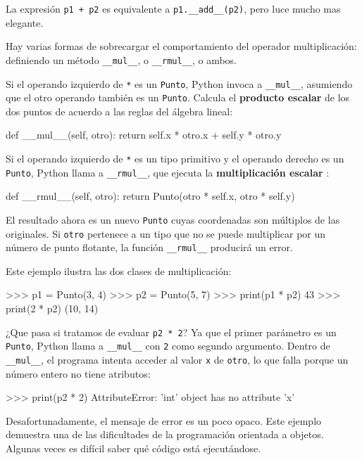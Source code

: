 La expresión \texttt{p1 + p2} es equivalente a \texttt{p1.\_\_add\_\_(p2)},
pero luce mucho mas elegante.

Hay varias formas de sobrecargar el comportamiento del operador multiplicación:
definiendo un método \texttt{\_\_mul\_\_}, o \texttt{\_\_rmul\_\_},
o ambos.

Si el operando izquierdo de \texttt{{*}} es un \texttt{Punto}, Python
invoca a \texttt{\_\_mul\_\_}, asumiendo que el otro operando también
es un \texttt{Punto}. Calcula el \textbf{producto escalar} de los
dos puntos de acuerdo a las reglas del álgebra lineal:
\begin{pythoncode}
def __mul__(self, otro):
  return self.x * otro.x + self.y * otro.y
\end{pythoncode}

Si el operando izquierdo de \texttt{{*}} es un tipo primitivo y el
operando derecho es un \texttt{Punto}, Python llama a \texttt{\_\_rmul\_\_},
que ejecuta la \textbf{multiplicación escalar }:
\begin{pythoncode}
def __rmul__(self, otro):
  return Punto(otro * self.x,  otro * self.y)
\end{pythoncode}

El resultado ahora es un nuevo \texttt{Punto} cuyas coordenadas son
múltiplos de las originales. Si \texttt{otro} pertenece a un tipo
que no se puede multiplicar por un número de punto flotante, la función
\texttt{\_\_rmul\_\_} producirá un error.

Este ejemplo ilustra las dos clases de multiplicación:
\begin{pyconcode}
>>> p1 = Punto(3, 4)
>>> p2 = Punto(5, 7)
>>> print(p1 * p2)
43
>>> print(2 * p2)
(10, 14)
\end{pyconcode}
 ¿Que pasa si tratamos de evaluar \texttt{p2 {*} 2}? Ya que el primer
parámetro es un \texttt{Punto}, Python llama a \texttt{\_\_mul\_\_}
con \texttt{2} como segundo argumento. Dentro de \texttt{\_\_mul\_\_},
el programa intenta acceder al valor \texttt{x} de \texttt{otro},
lo que falla porque un número entero no tiene atributos:

\begin{pyconcode}
>>> print(p2 * 2)
AttributeError: 'int' object has no attribute 'x'
\end{pyconcode}
 Desafortunadamente, el mensaje de error es un poco opaco. Este ejemplo
demuestra una de las dificultades de la programación orientada a objetos.
Algunas veces es difícil saber qué código está ejecutándose.

